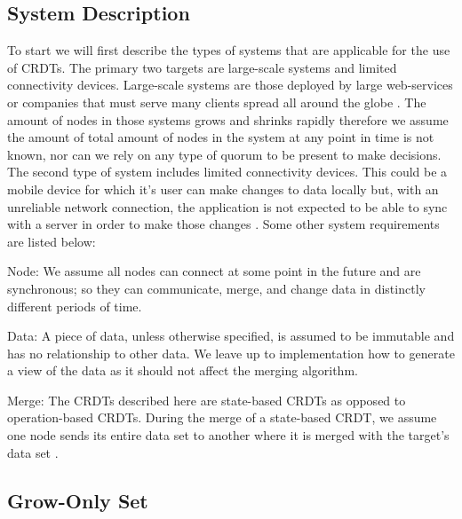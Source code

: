 \documentclass{article}
\begin{document}
\begin{multicols}{2}
\begin{refsection}
\subsection*{System Description}

To start we will first describe the types of systems that are applicable
for the use of CRDTs. The primary two targets are large-scale systems
and limited connectivity devices. Large-scale systems are those deployed
by large web-services or companies that must serve many clients spread
all around the globe \cite{tao_merging_2015} \cite{balegas_making_2016}.
The amount of nodes in those systems grows and shrinks rapidly therefore
we assume the amount of total amount of nodes in the system at any point
in time is not known, nor can we rely on any type of quorum to be
present to make decisions. The second type of system includes limited
connectivity devices. This could be a mobile device for which it's user
can make changes to data locally but, with an unreliable network
connection, the application is not expected to be able to sync with a
server in order to make those changes \cite{perkins_simba:_2015}. Some
other system requirements are listed below:

Node: We assume all nodes can connect at some point in the future and
are synchronous; so they can communicate, merge, and change data in
distinctly different periods of time.

Data: A piece of data, unless otherwise specified, is assumed to be
immutable and has no relationship to other data. We leave up to
implementation how to generate a view of the data as it should not
affect the merging algorithm.

Merge: The CRDTs described here are state-based CRDTs as opposed to
operation-based CRDTs. During the merge of a state-based CRDT, we
assume one node sends its entire data set to another where it is merged
with the target's data set \cite{shapiro_comprehensive_2011}.


\subsection*{Grow-Only Set}


\end{refsection}
\end{multicols}
\end{document}
